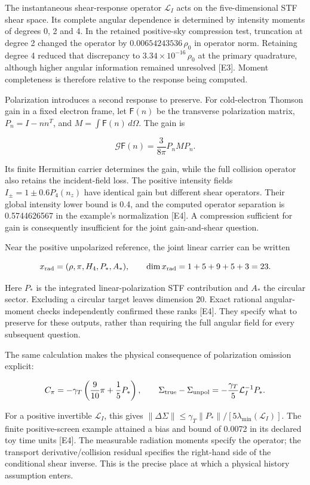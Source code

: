 \documentclass[
  10pt,
]{article}
\begin{document}
The instantaneous shear-response operator \(\mathcal L_I\) acts on the
five-dimensional STF shear space. Its complete angular dependence is
determined by intensity moments of degrees 0, 2 and 4. In the retained
positive-sky compression test, truncation at degree 2 changed the
operator by \(0.00654243536\,\rho_0\) in operator norm. Retaining degree
4 reduced that discrepancy to \(3.34\times10^{-16}\,\rho_0\) at the
primary quadrature, although higher angular information remained
unresolved {[}E3{]}. Moment completeness is therefore relative to the
response being computed.

Polarization introduces a second response to preserve. For cold-electron
Thomson gain in a fixed electron frame, let \(\mathsf F(n)\) be the
transverse polarization matrix, \(P_n=I-nn^T\), and
\(M=\int\mathsf F(n)\,d\Omega\). The gain is

\[
\mathscr G\mathsf F(n)=\frac{3}{8\pi}P_nMP_n.
\]

Its finite Hermitian carrier determines the gain, while the full
collision operator also retains the incident-field loss. The positive
intensity fields \(I_\pm=1\pm0.6P_4(n_z)\) have identical gain but
different shear operators. Their global intensity lower bound is 0.4,
and the computed operator separation is 0.5744626567 in the example's
normalization {[}E4{]}. A compression sufficient for gain is
consequently insufficient for the joint gain-and-shear question.

Near the positive unpolarized reference, the joint linear carrier can be
written

\[
x_{\rm rad}=(\rho,\pi,H_4,P_*,A_*),
\qquad \dim x_{\rm rad}=1+5+9+5+3=23.
\]

Here \(P_*\) is the integrated linear-polarization STF contribution and
\(A_*\) the circular sector. Excluding a circular target leaves
dimension 20. Exact rational angular-moment checks independently
confirmed these ranks {[}E4{]}. They specify what to preserve for these
outputs, rather than requiring the full angular field for every
subsequent question.

The same calculation makes the physical consequence of polarization
omission explicit:

\[
C_\pi=-\gamma_T\left(\frac9{10}\pi+\frac15P_*\right),
\qquad
\Sigma_{\rm true}-\Sigma_{\rm unpol}
=-\frac{\gamma_T}{5}\mathcal L_I^{-1}P_*.
\]

For a positive invertible \(\mathcal L_I\), this gives
\(\|\Delta\Sigma\|\le\gamma_T\|P_*\|/[5\lambda_{\min}(\mathcal L_I)]\).
The finite positive-screen example attained a bias and bound of 0.0072
in its declared toy time units {[}E4{]}. The measurable radiation
moments specify the operator; the transport derivative/collision
residual specifies the right-hand side of the conditional shear inverse.
This is the precise place at which a physical history assumption enters.
\end{document}
